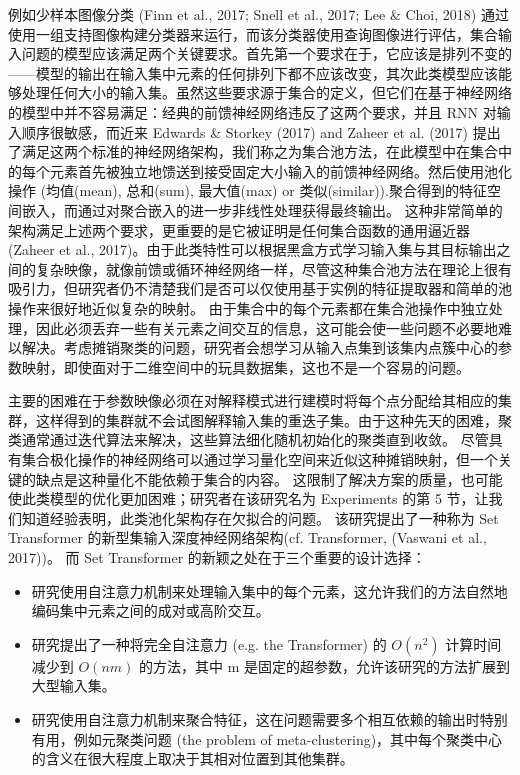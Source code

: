 例如少样本图像分类 (Finn et al., 2017; Snell et al., 2017; Lee \& Choi, 2018) 通过使用一组支持图像构建分类器来运行，而该分类器使用查询图像进行评估，集合输入问题的模型应该满足两个关键要求。首先第一个要求在于，它应该是排列不变的——模型的输出在输入集中元素的任何排列下都不应该改变，其次此类模型应该能够处理任何大小的输入集。虽然这些要求源于集合的定义，但它们在基于神经网络的模型中并不容易满足：经典的前馈神经网络违反了这两个要求，并且 RNN 对输入顺序很敏感，而近来 Edwards \& Storkey (2017) and Zaheer et al. (2017)  提出了满足这两个标准的神经网络架构，我们称之为集合池方法，在此模型中在集合中的每个元素首先被独立地馈送到接受固定大小输入的前馈神经网络。然后使用池化操作 (均值(mean), 总和(sum), 最大值(max) or 类似(similar)).聚合得到的特征空间嵌入，而通过对聚合嵌入的进一步非线性处理获得最终输出。
这种非常简单的架构满足上述两个要求，更重要的是它被证明是任何集合函数的通用逼近器 (Zaheer et al., 2017)。由于此类特性可以根据黑盒方式学习输入集与其目标输出之间的复杂映像，就像前馈或循环神经网络一样，尽管这种集合池方法在理论上很有吸引力，但研究者仍不清楚我们是否可以仅使用基于实例的特征提取器和简单的池操作来很好地近似复杂的映射。
由于集合中的每个元素都在集合池操作中独立处理，因此必须丢弃一些有关元素之间交互的信息，这可能会使一些问题不必要地难以解决。考虑摊销聚类的问题，研究者会想学习从输入点集到该集内点簇中心的参数映射，即使面对于二维空间中的玩具数据集，这也不是一个容易的问题。

主要的困难在于参数映像必须在对解释模式进行建模时将每个点分配给其相应的集群，这样得到的集群就不会试图解释输入集的重迭子集。由于这种先天的困难，聚类通常通过迭代算法来解决，这些算法细化随机初始化的聚类直到收敛。
尽管具有集合极化操作的神经网络可以通过学习量化空间来近似这种摊销映射，但一个关键的缺点是这种量化不能依赖于集合的内容。
这限制了解决方案的质量，也可能使此类模型的优化更加困难；研究者在该研究名为 Experiments 的第 5 节，让我们知道经验表明，此类池化架构存在欠拟合的问题。
该研究提出了一种称为 Set Transformer 的新型集输入深度神经网络架构(cf. Transformer, (Vaswani et al., 2017))。 而 Set Transformer 的新颖之处在于三个重要的设计选择：

\begin{itemize}
\item 研究使用自注意力机制来处理输入集中的每个元素，这允许我们的方法自然地编码集中元素之间的成对或高阶交互。
\item 研究提出了一种将完全自注意力 (e.g. the Transformer) 的 $O(n^{2})$ 计算时间减少到 $O(nm)$ 的方法，其中 m 是固定的超参数，允许该研究的方法扩展到大型输入集。
\item 研究使用自注意力机制来聚合特征，这在问题需要多个相互依赖的输出时特别有用，例如元聚类问题 (the problem of meta-clustering)，其中每个聚类中心的含义在很大程度上取决于其相对位置到其他集群。
\end{itemize}

